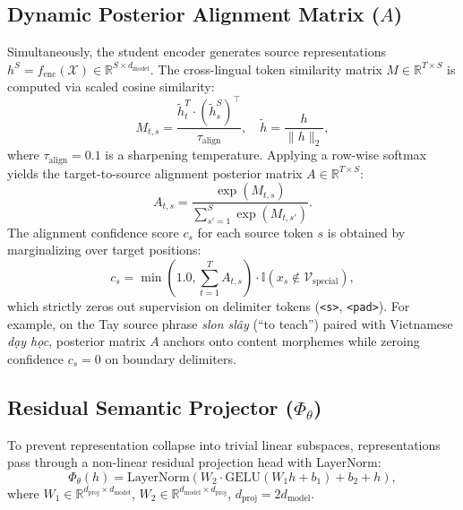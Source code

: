 \documentclass[11pt]{article}
\begin{document}
\subsection{Dynamic Posterior Alignment Matrix ($A$)}
Simultaneously, the student encoder generates source representations $h^S = f_{\text{enc}}(\mathcal{X}) \in \mathbb{R}^{S \times d_{\text{model}}}$. The cross-lingual token similarity matrix $M \in \mathbb{R}^{T \times S}$ is computed via scaled cosine similarity:
\begin{equation}
    M_{t, s} = \frac{\tilde{h}_t^T \cdot (\tilde{h}_s^S)^\top}{\tau_{\text{align}}}, \quad \tilde{h} = \frac{h}{\|h\|_2},
    \label{eq:sim_matrix}
\end{equation}
where $\tau_{\text{align}} = 0.1$ is a sharpening temperature. Applying a row-wise softmax yields the target-to-source alignment posterior matrix $A \in \mathbb{R}^{T \times S}$:
\begin{equation}
    A_{t, s} = \frac{\exp(M_{t, s})}{\sum_{s'=1}^S \exp(M_{t, s'})}.
    \label{eq:posterior_matrix}
\end{equation}
The alignment confidence score $c_s$ for each source token $s$ is obtained by marginalizing over target positions:
\begin{equation}
    c_s = \min\left(1.0, \sum_{t=1}^T A_{t, s}\right) \cdot \mathbb{I}(x_s \notin \mathcal{V}_{\text{special}}),
    \label{eq:confidence_score}
\end{equation}
which strictly zeros out supervision on delimiter tokens (\texttt{<s>}, \texttt{<pad>}). For example, on the Tay source phrase \textit{slon sl\^{a}y} (``to teach'') paired with Vietnamese \textit{d\d{a}y h\d{o}c}, posterior matrix $A$ anchors onto content morphemes while zeroing confidence $c_s = 0$ on boundary delimiters.

\subsection{Residual Semantic Projector ($\Phi_\theta$)}
To prevent representation collapse into trivial linear subspaces, representations pass through a non-linear residual projection head with LayerNorm:
\begin{equation}
    \Phi_\theta(h) = \text{LayerNorm}(W_2 \cdot \text{GELU}(W_1 h + b_1) + b_2 + h),
    \label{eq:projector}
\end{equation}
where $W_1 \in \mathbb{R}^{d_{\text{proj}} \times d_{\text{model}}}$, $W_2 \in \mathbb{R}^{d_{\text{model}} \times d_{\text{proj}}}$, $d_{\text{proj}} = 2 d_{\text{model}}$.
\end{document}
